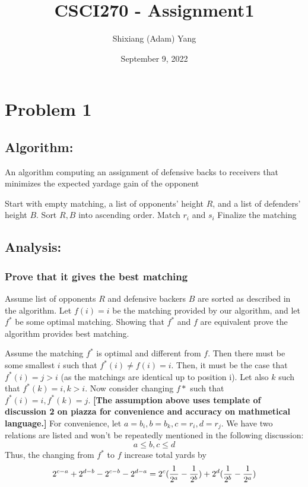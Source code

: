 \documentclass{article}
\author{Shixiang (Adam) Yang}
\date{September 9, 2022}
\title{CSCI270 - Assignment1}
\begin{document}
 \maketitle
\section{Problem 1}
    \subsection{Algorithm: }
    \begin{algorithm}
    \caption{An algorithm computing an assignment of defensive backs to receivers that minimizes the expected yardage gain of the opponent}\label{alg:cap}
    \begin{algorithmic}
    
    \State Start with empty matching, a list of opponents' height $R$, and a list of defenders' height $B$.
    \State Sort $R, B$ into ascending order.
        \State Match $r_i$ and $s_i$
    \EndFor
    \State Finalize the matching
    \end{algorithmic}
    \end{algorithm}


    \subsection{Analysis:}
        \subsubsection{Prove that it gives the best matching} 
         Assume list of opponents $R$ and defensive backers $B$ are sorted as described in the algorithm. Let $f(i)=i$ be the matching provided by our algorithm, and let $f^*$ be some optimal matching. Showing that $f^*$ and $f$ are equivalent prove the algorithm provides best matching.
        
        Assume the matching $f^*$ is optimal and different from $f$. Then there must be some smallest $i$ such that $f^*(i) \neq f(i) = i$. Then, it must be the case that $f^*(i) = j > i$ (as the matchings are identical up to position i). Let also $k$ such that $f^*(k) = i, k > i$. Now consider changing $f*$ such that $f^*(i)=i, f^*(k)=j$. \textbf{[The assumption above uses template of discussion 2 on piazza for convenience and accuracy on mathmetical language.]} 
        For convenience, let $a=b_i, b=b_k, c=r_i, d=r_j$. We have two relations are listed and won't be repeatedly mentioned in the following discussion:
        \[a\leq b, c\leq d \]
        \indent Thus, the changing from $f^*$ to $f$ increase total yards by
        \[2^{c-a}+2^{d-b}-2^{c-b}-2^{d-a}\\
        =2^c(\frac{1}{2^a}-\frac{1}{2^b})+2^d(\frac{1}{2^b}-\frac{1}{2^a})
        \]
\end{document}
